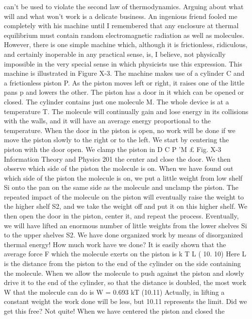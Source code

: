 {{{{{{{{{{{can’t be used to violate the second law of thermodynamics.
Arguing about what will and what won’t work is a delicate
business. An ingenious friend fooled me completely with his
machine until I remembered that any enclosure at thermal equilibrium
must contain random electromagnetic radiation as well as
molecules. However, there is one simple machine which, although
it is frictionless, ridiculous, and certainly inoperable in any practical
sense, is, I believe, not physically impossible in the very special
sense in which physicists use this expression. This machine is
illustrated in Figure X-3.
The machine makes use of a cylinder C and a frictionless piston
P. As the piston moves left or right, it raises one of the little pans
p and lowers the other. The piston has a door in it which can be
opened or closed. The cylinder contains just one molecule M. The
whole device is at a temperature T. The molecule will continually
gain and lose energy in its collisions with the walls, and it will have
an average energy proportional to the temperature.
When the door in the piston is open, no work will be done if we
move the piston slowly to the right or to the left. We start by
centering the piston with the door open. We clamp the piston in
D C
P 'M £
Fig. X-3
Information Theory and Physics
201
the center and close the door. We then observe which side of the
piston the molecule is on. When we have found out which side of
the piston the molecule is on, we put a little weight from low shelf
Si onto the pan on the same side as the molecule and unclamp
the piston. The repeated impact of the molecule on the piston will
eventually raise the weight to the higher shelf S2, and we take the
weight off and put it on this higher shelf. We then open the door
in the piston, center it, and repeat the process. Eventually, we will
have lifted an enormous number of little weights from the lower
shelves Si to the upper shelves S2. We have done organized work
by means of disorganized thermal energy!
How much work have we done? It is easily shown that the
average force F which the molecule exerts on the piston is
k T
L ( 10. 10)
Here L is the distance from the piston to the end of the cylinder
on the side containing the molecule. When we allow the molecule
to push against the piston and slowly drive it to the end of the
cylinder, so that the distance is doubled, the most work W that the
molecule can do is
W = 0.693 kT (10.11)
Actually, in lifting a constant weight the work done will be less,
but 10.11 represents the limit. Did we get this free?
Not quite! When we have centered the piston and closed the
}}}}}}}}}}}
